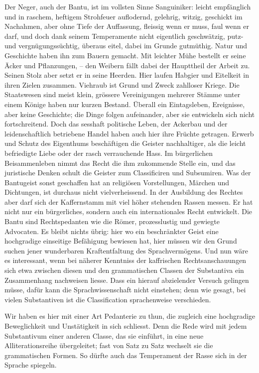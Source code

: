 Der Neger, auch der Bantu, ist im vollsten Sinne Sanguiniker: leicht empfänglich und in raschem, heftigem Strohfeuer auflodernd, gelehrig, witzig, geschickt im Nachahmen, aber ohne Tiefe der Auffassung, fleissig wenn er muss, faul wenn er darf, und doch dank seinem Temperamente nicht eigentlich  geschwätzig, putz- und vergnügungssüchtig, überaus eitel, dabei im Grunde gutmüthig. Natur und Geschichte haben ihn zum Bauern gemacht. Mit leichter Mühe bestellt er seine Äcker und Pflanzungen, – den Weibern fällt dabei der Haupttheil der \label{fp.401} Arbeit zu. Seinen Stolz aber setzt er in seine Heerden. Hier laufen Habgier und Eitelkeit in ihren Zielen zusammen. Viehraub ist Grund und Zweck zahlloser Kriege. Die Staatswesen sind meist klein, grössere Vereinigungen mehrerer Stämme unter einem Könige haben nur kurzen Bestand. Überall ein Eintagsleben, Ereignisse, aber keine Geschichte; die Dinge folgen aufeinander, aber sie entwickeln sich nicht fortschreitend. Doch das sesshaft politische Leben, der Ackerbau und der leidenschaftlich betriebene Handel haben auch hier ihre Früchte getragen. Erwerb und Schutz des Eigenthums beschäftigen die Geister nachhaltiger, als die leicht befriedigte Liebe oder der rasch verrauchende Hass. Im bürgerlichen Beisammenleben nimmt das Recht die ihm zukommende Stelle ein, und das juristische Denken schult die Geister zum Classificiren und Subsumiren. Was der Bantugeist sonst geschaffen hat an religiösen Vorstellungen, Märchen und Dichtungen, ist durchaus nicht vielverheissend. In der Ausbildung des Rechtes aber darf sich der Kaffernstamm mit viel höher stehenden Rassen messen. Er hat nicht nur ein bürgerliches, sondern auch ein internationales Recht entwickelt. Die Bantu sind Rechtspedanten wie die Römer, prozesslustig und gewiegte Advocaten. Es bleibt nichts  übrig: hier wo ein beschränkter Geist eine hochgradige einseitige Befähigung bewiesen hat, hier müssen wir den Grund suchen jener wunderbaren Kraftentfaltung des Sprachvermögens. Und nun wäre es interessant, wenn bei näherer Kenntniss der kaffrischen Rechtsanschauungen sich etwa zwischen diesen und den grammatischen Classen der Substantiva ein Zusammenhang nachweisen liesse. Dass ein hierauf abzielender Versuch gelingen müsse, dafür kann die Sprachwissenschaft nicht einstehen; denn wie gesagt, bei vielen Substantiven ist die Classification sprachenweise verschieden.

Wir haben es hier mit einer Art Pedanterie zu thun, die zugleich eine hochgradige Beweglichkeit und Unstätigkeit in sich schliesst. Denn die Rede \label{sp.423} wird mit jedem Substantivum einer anderen Classe, das sie einführt, in eine neue Alliterationsreihe übergeleitet; fast von Satz zu Satz wechselt sie die grammatischen Formen. So dürfte auch das Temperament der Rasse sich in der Sprache spiegeln.

